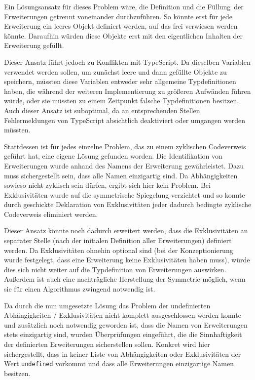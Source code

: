 Ein Lösungsansatz für dieses Problem wäre, die Definition und die \glqq Füllung\grqq\ der Erweiterungen getrennt voneinander durchzuführen. So könnte erst für jede Erweiterung ein leeres Objekt definiert werden, auf das frei verwiesen werden könnte. Daraufhin würden diese Objekte erst mit den eigentlichen Inhalten der Erweiterung gefüllt.

Dieser Ansatz führt jedoch zu Konflikten mit TypeScript. Da dieselben Variablen verwendet werden sollen, um zunächst leere und dann gefüllte Objekte zu speichern, müssten diese Variablen entweder sehr allgemeine Typdefinitionen haben, die während der weiteren Implementierung zu größeren Aufwänden führen würde, oder sie müssten zu einem Zeitpunkt falsche Typdefinitionen besitzen. Auch dieser Ansatz ist suboptimal, da an entsprechenden Stellen Fehlermeldungen von TypeScript absichtlich deaktiviert oder umgangen werden müssten.

Stattdessen ist für jedes einzelne Problem, das zu einem zyklischen Codeverweis geführt hat, eine eigene Lösung gefunden worden. Die Identifikation von Erweiterungen wurde anhand des Namens der Erweiterung gewährleistet. Dazu muss sichergestellt sein, dass alle Namen einzigartig sind. Da Abhängigkeiten sowieso nicht zyklisch sein dürfen, ergibt sich hier kein Problem. Bei Exklusivitäten wurde auf die symmetrische Spiegelung verzichtet und so konnte durch geschickte Deklaration von Exklusivitäten jeder dadurch bedingte zyklische Codeverweis eliminiert werden.

Dieser Ansatz könnte noch dadurch erweitert werden, dass die Exklusivitäten an separater Stelle (nach der initialen Definition aller Erweiterungen) definiert werden. Da Exklusivitäten ohnehin optional sind (bei der Konzeptionierung wurde festgelegt, dass eine Erweiterung keine Exklusivitäten haben muss), würde dies sich nicht weiter auf die Typdefinition von Erweiterungen auswirken. Außerdem ist auch eine nachträgliche Herstellung der Symmetrie möglich, wenn sie für einen Algorithmus zwingend notwendig ist.

Da durch die nun umgesetzte Lösung das Problem der undefinierten Abhängigkeiten / Exklusivitäten nicht komplett ausgeschlossen werden konnte und zusätzlich noch notwendig geworden ist, dass die Namen von Erweiterungen stets einzigartig sind, wurden Überprüfungen eingeführt, die die Sinnhaftigkeit der definierten Erweiterungen sicherstellen sollen. Konkret wird hier sichergestellt, dass in keiner Liste von Abhängigkeiten oder Exklusivitäten der Wert \verb|undefined| vorkommt und dass alle Erweiterungen einzigartige Namen besitzen.

